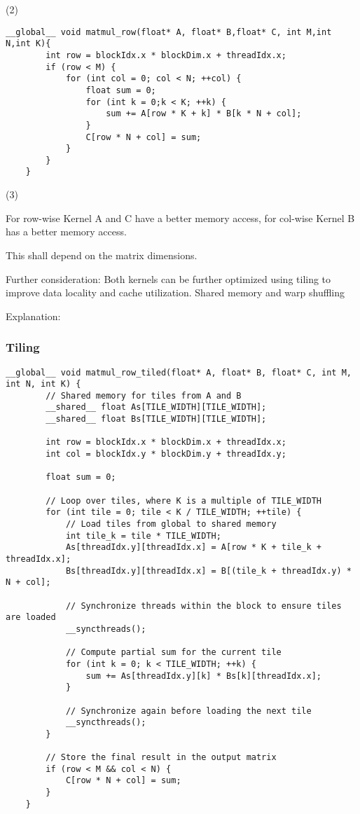 \documentclass{article}
\begin{document}
(2)

\begin{lstlisting}[breaklines=true]
    __global__ void matmul_row(float* A, float* B,float* C, int M,int N,int K){
        int row = blockIdx.x * blockDim.x + threadIdx.x;
        if (row < M) {
            for (int col = 0; col < N; ++col) {
                float sum = 0;
                for (int k = 0;k < K; ++k) {
                    sum += A[row * K + k] * B[k * N + col];
                }
                C[row * N + col] = sum;
            }
        }
    }
\end{lstlisting}

(3)

For row-wise Kernel A and C have a better memory access, for col-wise Kernel B has a better memory access.

This shall depend on the matrix dimensions.

Further consideration:
Both kernels can be further optimized using tiling to improve data locality and cache utilization. Shared memory and warp shuffling

Explanation:
\subsubsection{Tiling}
\begin{lstlisting}[breaklines=true]
    __global__ void matmul_row_tiled(float* A, float* B, float* C, int M, int N, int K) {
        // Shared memory for tiles from A and B
        __shared__ float As[TILE_WIDTH][TILE_WIDTH]; 
        __shared__ float Bs[TILE_WIDTH][TILE_WIDTH];
    
        int row = blockIdx.x * blockDim.x + threadIdx.x;
        int col = blockIdx.y * blockDim.y + threadIdx.y;
    
        float sum = 0;
    
        // Loop over tiles, where K is a multiple of TILE_WIDTH
        for (int tile = 0; tile < K / TILE_WIDTH; ++tile) {
            // Load tiles from global to shared memory
            int tile_k = tile * TILE_WIDTH;
            As[threadIdx.y][threadIdx.x] = A[row * K + tile_k + threadIdx.x];
            Bs[threadIdx.y][threadIdx.x] = B[(tile_k + threadIdx.y) * N + col];
    
            // Synchronize threads within the block to ensure tiles are loaded
            __syncthreads();
    
            // Compute partial sum for the current tile
            for (int k = 0; k < TILE_WIDTH; ++k) {
                sum += As[threadIdx.y][k] * Bs[k][threadIdx.x];
            }
    
            // Synchronize again before loading the next tile
            __syncthreads();
        }
    
        // Store the final result in the output matrix
        if (row < M && col < N) {
            C[row * N + col] = sum;
        }
    }    
\end{lstlisting}
\end{document}
